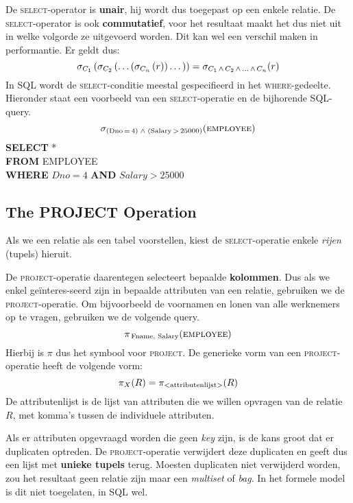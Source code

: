 \noindent De \textsc{select}-operator is \textbf{unair}, hij wordt dus toegepast op een enkele relatie. De \textsc{select}-operator is ook \textbf{commutatief}, voor het resultaat maakt het dus niet uit in welke volgorde ze uitgevoerd worden. Dit kan wel een verschil maken in performantie. Er geldt dus:
\vspace{-2mm}
\[
\sigma_{C_1} \left( \sigma_{C_2} \left( \dots\relax \left( \sigma_{C_n} \left( r \right) \right) \dots \right) \right) = \sigma_{C_1 \,\wedge\, C_2 \,\wedge\, \dots \,\wedge\, C_n}(r)
\]
In SQL wordt de \textsc{select}-conditie meestal gespecifieerd in het \textsc{where}-gedeelte. Hieronder staat een voorbeeld van een \textsc{select}-operatie en de bijhorende SQL-query.
\vspace{-2mm}
\[ \sigma_{(\text{Dno}\,=\,4) \; \wedge \; (\text{Salary}\,>\,25000)}(\textsc{employee}) \]
\indent \textbf{SELECT} *\\
\indent \textbf{FROM} EMPLOYEE\\
\indent	\textbf{WHERE} $\textit{Dno}=4$ \textbf{AND} $\textit{Salary}>25000$

\subsection{The PROJECT Operation}
Als we een relatie als een tabel voorstellen, kiest de \textsc{select}-operatie enkele \textit{rijen} (tupels) hieruit.

De \textsc{project}-operatie daarentegen selecteert bepaalde \textbf{kolommen}. Dus als we enkel ge\"interes-seerd zijn in bepaalde attributen van een relatie, gebruiken we de \textsc{project}-operatie. Om bijvoorbeeld de voornamen en lonen van alle werknemers op te vragen, gebruiken we de volgende query.
\vspace{-2mm}
\[ \pi_{\,\text{Fname, Salary}}(\textsc{employee}) \]
Hierbij is $\pi$ dus het symbool voor \textsc{project}. De generieke vorm van een \textsc{project}-operatie heeft de volgende vorm:
\vspace{-2mm}
\[ \pi_X(R) = \pi_\text{{\textless}attributenlijst{\textgreater}}(R) \]
De attributenlijst is de lijst van attributen die we willen opvragen van de relatie $R$, met komma's tussen de individuele attributen.

Als er attributen opgevraagd worden die geen \textit{key} zijn, is de kans groot dat er duplicaten optreden. De \textsc{project}-operatie verwijdert deze duplicaten en geeft dus een lijst met \textbf{unieke tupels} terug. Moesten duplicaten niet verwijderd worden, zou het resultaat geen relatie zijn maar een \textit{multiset} of \textit{bag}. In het formele model is dit niet toegelaten, in SQL wel.

